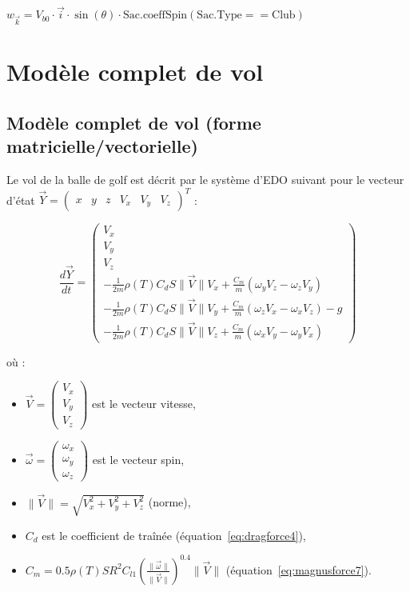 \documentclass[10pt,a4paper]{report}
\begin{document}
$w_{\overrightarrow{k}} = V_{b0} \cdot \overrightarrow{i} \cdot \sin(\theta) \cdot \text{Sac.coeffSpin}(\text{Sac.Type} == \text{Club})$

\section{Modèle complet de vol}
\subsection{Modèle complet de vol (forme matricielle/vectorielle)}
Le vol de la balle de golf est décrit par le système d'EDO suivant pour le vecteur d'état $\vec{Y} = \begin{pmatrix} x & y & z & V_x & V_y & V_z \end{pmatrix}^T$ :

\begin{equation}
    \frac{d\vec{Y}}{dt} = \begin{pmatrix}
    V_x \\
    V_y \\
    V_z \\
    -\frac{1}{2m} \rho(T) C_d S \|\vec{V}\| V_x + \frac{C_m}{m} (\omega_y V_z - \omega_z V_y) \\
    -\frac{1}{2m} \rho(T) C_d S \|\vec{V}\| V_y + \frac{C_m}{m} (\omega_z V_x - \omega_x V_z) - g \\
    -\frac{1}{2m} \rho(T) C_d S \|\vec{V}\| V_z + \frac{C_m}{m} (\omega_x V_y - \omega_y V_x)
    \end{pmatrix}
    \label{eq:ode_system}
\end{equation}

\noindent
où :
\begin{itemize}
    \item $\vec{V} = \begin{pmatrix} V_x \\ V_y \\ V_z \end{pmatrix}$ est le vecteur vitesse,
    \item $\vec{\omega} = \begin{pmatrix} \omega_x \\ \omega_y \\ \omega_z \end{pmatrix}$ est le vecteur spin,
    \item $\|\vec{V}\| = \sqrt{V_x^2 + V_y^2 + V_z^2}$ (norme),
    \item $C_d$ est le coefficient de traînée (équation~\ref{eq:dragforce4}),
    \item $C_m = 0.5 \rho(T) S R^2 C_{l1} \left( \frac{\|\vec{\omega}\|}{\|\vec{V}\|} \right)^{0.4} \|\vec{V}\|$ (équation~\ref{eq:magnusforce7}).
\end{itemize}
\end{document}
